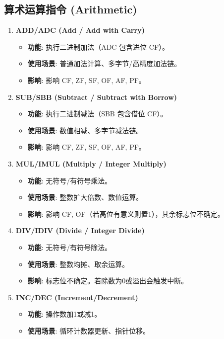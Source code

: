 \documentclass[12pt,a4paper]{ctexart}
\begin{document}
\subsection{算术运算指令 (Arithmetic)}
\begin{enumerate}
    \item \textbf{ADD/ADC (Add / Add with Carry)}
    \begin{itemize}
        \item \textbf{功能}: 执行二进制加法（ADC 包含进位 CF）。
        \item \textbf{使用场景}: 普通加法计算、多字节/高精度加法链。
        \item \textbf{影响}: 影响 CF, ZF, SF, OF, AF, PF。
    \end{itemize}
    \item \textbf{SUB/SBB (Subtract / Subtract with Borrow)}
    \begin{itemize}
        \item \textbf{功能}: 执行二进制减法（SBB 包含借位 CF）。
        \item \textbf{使用场景}: 数值相减、多字节减法链。
        \item \textbf{影响}: 影响 CF, ZF, SF, OF, AF, PF。
    \end{itemize}
    \item \textbf{MUL/IMUL (Multiply / Integer Multiply)}
    \begin{itemize}
        \item \textbf{功能}: 无符号/有符号乘法。
        \item \textbf{使用场景}: 整数扩大倍数、数值运算。
        \item \textbf{影响}: 影响 CF, OF（若高位有意义则置1），其余标志位不确定。
    \end{itemize}
    \item \textbf{DIV/IDIV (Divide / Integer Divide)}
    \begin{itemize}
        \item \textbf{功能}: 无符号/有符号除法。
        \item \textbf{使用场景}: 整数均摊、取余运算。
        \item \textbf{影响}: 标志位不确定。若除数为0或溢出会触发中断。
    \end{itemize}
    \item \textbf{INC/DEC (Increment/Decrement)}
    \begin{itemize}
        \item \textbf{功能}: 操作数加1或减1。
        \item \textbf{使用场景}: 循环计数器更新、指针位移。

\end{itemize}
\end{enumerate}
\end{document}
